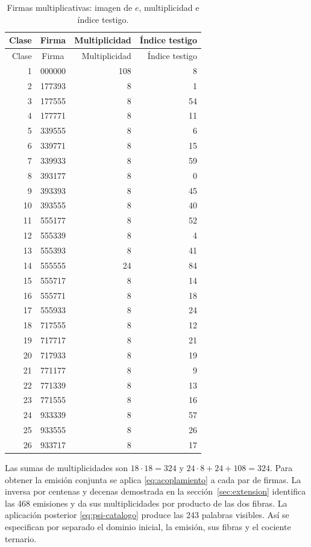 \begin{longtable}{rcrr}
\caption{Firmas multiplicativas: imagen de \(e\), multiplicidad e índice testigo.}
\label{iv:tabla-firmas-multiplicativas}\\
\toprule
Clase & Firma & Multiplicidad & Índice testigo\\
\midrule
\endfirsthead
\toprule
Clase & Firma & Multiplicidad & Índice testigo\\
\midrule
\endhead
1&000000&108&8\\
2&177393&8&1\\
3&177555&8&54\\
4&177771&8&11\\
5&339555&8&6\\
6&339771&8&15\\
7&339933&8&59\\
8&393177&8&0\\
9&393393&8&45\\
10&393555&8&40\\
11&555177&8&52\\
12&555339&8&4\\
13&555393&8&41\\
14&555555&24&84\\
15&555717&8&14\\
16&555771&8&18\\
17&555933&8&24\\
18&717555&8&12\\
19&717717&8&21\\
20&717933&8&19\\
21&771177&8&9\\
22&771339&8&13\\
23&771555&8&16\\
24&933339&8&57\\
25&933555&8&26\\
26&933717&8&17\\
\bottomrule
\end{longtable}

Las sumas de multiplicidades son \(18\cdot18=324\) y
\(24\cdot8+24+108=324\). Para obtener la emisión conjunta se aplica
\eqref{eq:acoplamiento} a cada par de firmas. La inversa por centenas
y decenas demostrada en la sección~\ref{sec:extension} identifica las 468
emisiones y da sus multiplicidades por producto de las dos fibras.
La aplicación posterior \eqref{eq:psi-catalogo} produce las 243
palabras visibles. Así se especifican por separado el dominio inicial,
la emisión, sus fibras y el cociente ternario.


